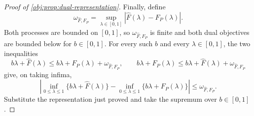 \documentclass[11pt]{article}
\begin{document}
\begin{proof}[Proof of \cref{obj:prop:dual-representation}]
Finally, define
\[
\omega_{\widehat F,F_P}=\sup_{\lambda\in[0,1]}|\widehat F(\lambda)-F_P(\lambda)|.
\]
Both processes are bounded on \([0,1]\), so \(\omega_{\widehat F,F_P}\) is finite and both dual objectives are bounded below for \(b\in[0,1]\). For every such \(b\) and every \(\lambda\in[0,1]\), the two inequalities
\[
b\lambda+\widehat F(\lambda)\leq b\lambda+F_P(\lambda)+\omega_{\widehat F,F_P},
\qquad
b\lambda+F_P(\lambda)\leq b\lambda+\widehat F(\lambda)+\omega_{\widehat F,F_P}
\]
give, on taking infima,
\[
\left|
\inf_{0\leq\lambda\leq1}\{b\lambda+\widehat F(\lambda)\}
-\inf_{0\leq\lambda\leq1}\{b\lambda+F_P(\lambda)\}
\right|\leq \omega_{\widehat F,F_P}.
\] %
Substitute the representation just proved and take the supremum over \(b\in[0,1]\). %
\end{proof}
\end{document}
